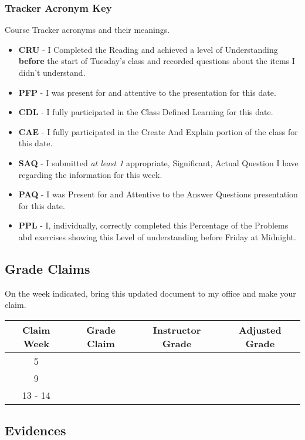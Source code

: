 \documentclass[12pt]{amsart}
\begin{document}
\subsubsection{Tracker Acronym Key} Course Tracker acronyms and their meanings.
\begin{itemize}
	\item \textbf{CRU} - I Completed the Reading and achieved a level of Understanding \textbf{before} the start of Tuesday's class and recorded questions about the items I didn't understand.
	\item \textbf{PFP} - I was present for and attentive to the presentation for this date.
	\item \textbf{CDL} - I fully participated in the Class Defined Learning for this date.
	\item \textbf{CAE} - I fully participated in the Create And Explain portion of the class for this date.
	\item \textbf{SAQ} - I submitted \textit{at least 1} appropriate, Significant, Actual Question I have regarding the information for this week.
	\item \textbf{PAQ} - I was Present for and Attentive to the Answer Questions presentation for this date.
	\item \textbf{PPL} - I, individually, correctly completed this Percentage of the Problems abd exercises showing  this Level of understanding before Friday at Midnight.
\end{itemize}
\subsection{Grade Claims} On the week indicated, bring this updated document to my office and make your claim.
\begin{table}[ht]
\begin{center}
\begin{tabular}{|c|c|c|c|}
	\hline
   \rowcolor[gray]{.9}
	Claim Week & Grade Claim & Instructor Grade & Adjusted Grade \\
	\hline
	 5 & & & \\
	\hline
	 9 & & & \\
	\hline
	13 - 14 & & &\\
	\hline
\end{tabular}
\end{center}
\end{table}

\newpage


\subsection{Evidences}
\end{document}
